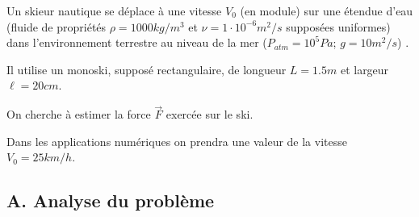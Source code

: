 Un skieur nautique se déplace à une vitesse $V_0$ (en module) sur une étendue d'eau 
(fluide de propriétés $\rho = 1000 kg/m^3$ et $\nu = 1\cdot 10^{-6} m^2/s$ supposées uniformes) dans l'environnement terrestre au niveau de la mer ($P_{atm} = 10^5 Pa $; $g =10m^2/s$) .

 Il utilise un monoski, supposé rectangulaire, de longueur $L= 1.5m$  et largeur $\ell = 20cm$.

On cherche à estimer la force $\vec F$ exercée sur le ski.

Dans les applications numériques on prendra une valeur de la vitesse $V_0 = 25km/h$.




\subsection*{A. Analyse du problème}

